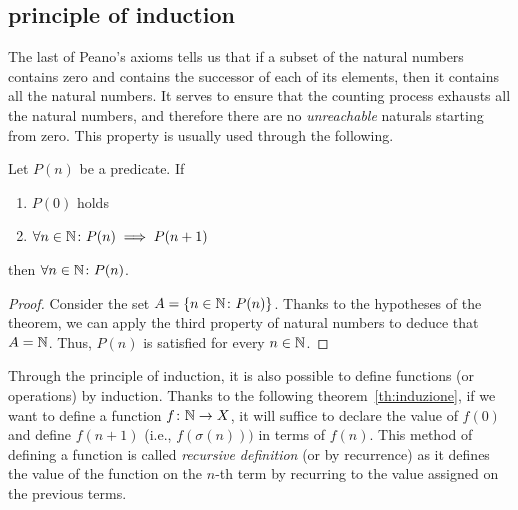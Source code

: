 \subsection{principle of induction}

The last of Peano's axioms 
tells us that if a subset of the natural numbers contains zero and contains the
successor of each of its elements, then it contains all the natural numbers.
It serves to ensure that the counting process exhausts all 
the natural numbers, and therefore there are no \emph{unreachable} naturals
starting from zero.
This property is usually used through the following.


%
%
\begin{theorem}
  Let $P(n)$ be a predicate.
  If 
  \begin{enumerate}
    \item $P(0)$ holds
    \item $\forall n\in {\mathbb N}\colon P(n)\implies P(n+1)$
  \end{enumerate} 
  then $\forall n\in {\mathbb N}\colon P(n)$.
\end{theorem}
%
\begin{proof}
  Consider the set $A=\{n\in {\mathbb N}\colon P(n)\}$.
  Thanks to the hypotheses of the theorem, we can apply the third
  property of natural numbers to deduce that $A={\mathbb N}$.
  Thus, $P(n)$ is satisfied for every $n\in{\mathbb N}$.
\end{proof}

Through the principle of induction, it is also possible 
to define functions (or operations) by induction.
Thanks to the following theorem~\ref{th:induzione}, 
if we want to define a function $f\colon{\mathbb N}\to X$,
it will suffice to declare the value of $f(0)$ and define $f(n+1)$ 
(i.e., $f(\sigma(n)))$ in terms of $f(n)$.
This method of defining a function is called 
\emph{recursive definition} (or by recurrence) as it defines 
the value of the function on the $n$-th term by recurring
to the value assigned on the previous terms.

